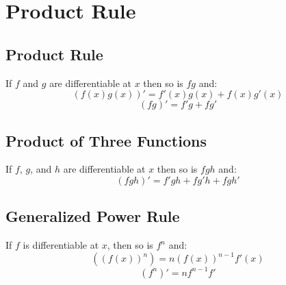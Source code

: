\section{Product Rule}
\subsection{Product Rule}
	If $f$ and $g$ are differentiable at $x$ then so is $fg$ and:
	\[\left( f(x)g(x) \right)' = f'(x)g(x) + f(x)g'(x)\]
	\[(fg)' = f'g + fg'\]
\subsection{Product of Three Functions}
	If $f$, $g$, and $h$ are differentiable at $x$ then so is $fgh$ and:
	\[(fgh)' = f'gh + fg'h + fgh'\]
\subsection{Generalized Power Rule} 
	If $f$ is differentiable at $x$, then so is $f^n$ and:
	\begin{equation}\label{eq:2.3:generalizedPowerRule}
		\left( \left( f(x) \right)^n \right) = n \left( f(x) \right)^{n-1} f'(x)
	\end{equation}
	\[\left( f^n \right)' = nf^{n-1}f'\]
